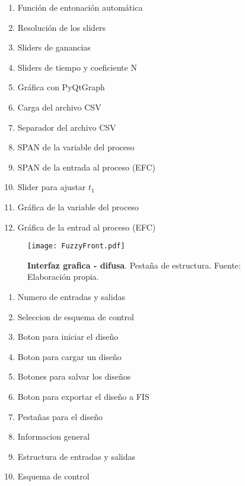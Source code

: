     \begin{multicols}{2}
        \begin{enumerate}[leftmargin=20pt]
            \item Función de entonación automática
            \item Resolución de los sliders
            \item Sliders de ganancias
            \item Sliders de tiempo y coeficiente N
            \item Gráfica con PyQtGraph
            \item Carga del archivo CSV
            \item Separador del archivo CSV
            \item SPAN de la variable del proceso
            \item SPAN de la entrada al proceso (EFC)
            \item Slider para ajustar $t_1$
            \item Gráfica de la variable del proceso
            \item Gráfica de la entrad al proceso (EFC)
        \end{enumerate}
    \end{multicols}


    
    \vfill
    
    \begin{figure}[htb]
        \centering
        \texttt{[image: FuzzyFront.pdf]}
        \caption[Interfaz grafica - difusa - estructura]{\textbf{Interfaz grafica - difusa}. Pestaña de estructura. Fuente: Elaboración propia.} 
        \label{fig:FuzzyFront}
    \end{figure}
    
    \vfill

    \begin{multicols}{2}
        \begin{enumerate}[leftmargin=20pt]
            \item Numero de entradas y salidas
            \item Seleccion de esquema de control
            \item Boton para iniciar el diseño
            \item Boton para cargar un diseño
            \item Botones para salvar los diseños
            \item Boton para exportar el diseño a FIS
            \item Pestañas para el diseño
            \item Informacion general
            \item Estructura de entradas y salidas
            \item Esquema de control
        \end{enumerate}
    \end{multicols}


